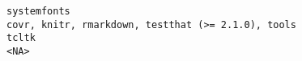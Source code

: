 \documentclass[
  letterpaper,
  DIV=11,
  numbers=noendperiod]{scrreprt}
\begin{document}
\begin{verbatim}
systemfonts                                                                                                                                                                                                                                                                                                                                                                                                                                                                                                                                                                                                                                                                                                                                                                                                                                                                                                                                                                                                                                                                                                                                                                                                                                                covr, knitr, rmarkdown, testthat (>= 2.1.0), tools
tcltk                                                                                                                                                                                                                                                                                                                                                                                                                                                                                                                                                                                                                                                                                                                                                                                                                                                                                                                                                                                                                                                                                                                                                                                                                                                                                                    <NA>

\end{verbatim}
\end{document}
